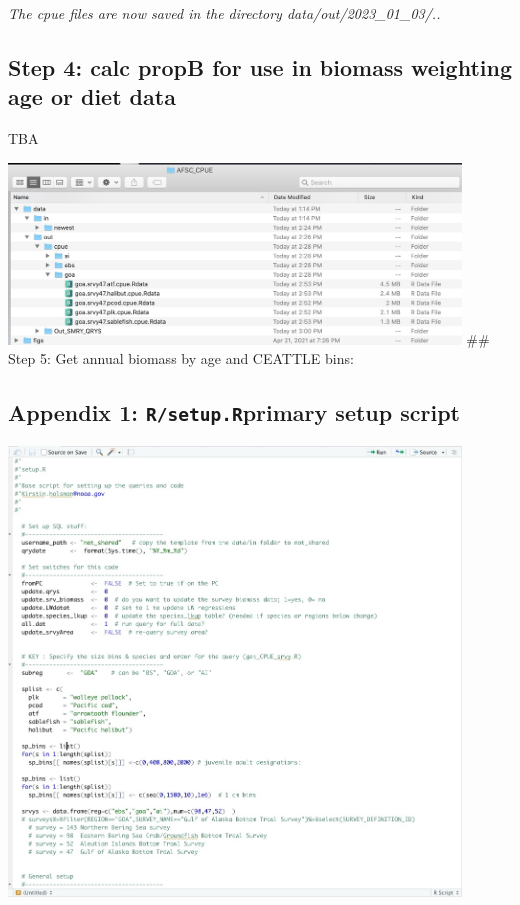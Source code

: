 \documentclass[
]{article}
\begin{document}
\emph{The cpue files are now saved in the directory
data/out/2023\_01\_03/..}

\hypertarget{step-4-calc-propb-for-use-in-biomass-weighting-age-or-diet-data}{%
\subsection{Step 4: calc propB for use in biomass weighting age or diet
data}\label{step-4-calc-propb-for-use-in-biomass-weighting-age-or-diet-data}}

TBA

\includegraphics[width=0.9\textwidth,height=\textheight]{figs/out_dir.jpg}
\#\# Step 5: Get annual biomass by age and CEATTLE bins:

\hypertarget{appendix-1-rsetup.rprimary-setup-script}{%
\subsection{\texorpdfstring{Appendix 1: \texttt{R/setup.R}primary setup
script}{Appendix 1: R/setup.Rprimary setup script}}\label{appendix-1-rsetup.rprimary-setup-script}}

\includegraphics[width=0.9\textwidth,height=\textheight]{figs/setup_large.jpg}
\end{document}
